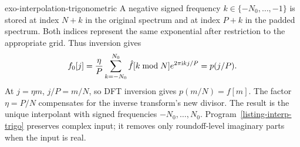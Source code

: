 \begin{correction}{exo-interpolation-trigonometric}
A negative signed frequency $k\in\{-N_0,\ldots,-1\}$ is stored at index
$N+k$ in the original spectrum and at index $P+k$ in the padded spectrum.
Both indices represent the same exponential after restriction to the
appropriate grid. Thus inversion gives
\[
 f_0[j]=\frac{\eta}{P}\sum_{k=-N_0}^{N_0}\hat{f}[k\bmod N]
                         e^{2\pi\mathrm{i} kj/P}=p(j/P).
\]
At $j=\eta m$, $j/P=m/N$, so DFT inversion gives $p(m/N)=f[m]$.
The factor $\eta=P/N$ compensates for the inverse transform's new divisor.
The result is the unique interpolant with signed frequencies $-N_0,\ldots,N_0$.
Program~\ref{listing-interp-trigo} preserves complex input; it removes only
roundoff-level imaginary parts when the input is real.
\begin{listing}[H]
\caption{Trigonometric interpolation by correctly scaled spectral padding.}
\label{listing-interp-trigo}
\end{listing}
\end{correction}

